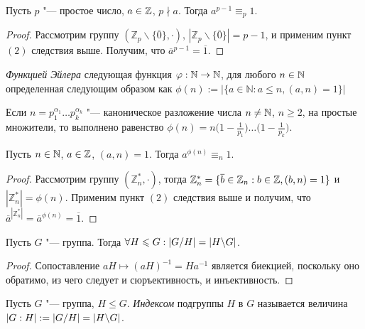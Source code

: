 \begin{corollary}
	Пусть $p$ "--- простое число, $a \in \mathbb{Z}$, $p \nmid a$. Тогда $a^{p-1} \equiv_p 1$.
\end{corollary}

\begin{proof}
	Рассмотрим группу $(\mathbb{Z}_p\backslash\{\overline{0}\}, \cdot)$, $|\mathbb{Z}_p\backslash\{\overline{0}\}| = p - 1$, и применим пункт $(2)$ следствия выше. Получим, что $\overline{a}^{p - 1} = \overline{1}$.
\end{proof}

\begin{definition}
	\textit{Функцией Эйлера} следующая функция $\varphi: \mathbb{N} \to \mathbb{N}$, для любого $n \in \mathbb{N}$ определенная следующим образом как $\phi(n) := \left|\{a \in \mathbb{N}: a \le n, (a, n) = 1\}\right|$
\end{definition}

\begin{note}
	Если $n = p_1^{\alpha_1}\dots p_k^{\alpha_k}$ "--- каноническое разложение числа $n \ne \mathbb{N}$, $n \ge 2$, на простые множители, то выполнено равенство $\phi(n) = n\big(1 - \frac{1}{p_1}\big)\dots\big(1 - \frac{1}{p_k}\big)$.
\end{note}

\begin{theorem}[Эйлера]
	Пусть $n \in \mathbb{N}$, $a \in \mathbb{Z}$, $(a, n) = 1$. Тогда $a^{\phi(n)} \equiv_n 1$.
\end{theorem}

\begin{proof}
	Рассмотрим группу $(\mathbb{Z}_n^*, \cdot)$, тогда $\mathbb{Z}_n^* = \{\overline{b} \in \mathbb{Z}_n: b \in \mathbb{Z}, (b, n) = 1\}$ и $|\mathbb{Z}_n^*| = \phi(n)$. Применим пункт $(2)$ следствия выше и получим, что $\overline{a}^{|\mathbb{Z}_n^*|} = \overline{a}^{\phi(n)} = \overline{1}$.
\end{proof}

\begin{proposition}
	Пусть $G$ "--- группа. Тогда $\forall H \le G: |G / H| \hm= |H \bs G|$.
\end{proposition}

\begin{proof}
	Сопоставление $aH \mapsto (aH)^{-1} = Ha^{-1}$ является биекцией, поскольку оно обратимо, из чего следует и сюръективность, и инъективность.
\end{proof}

\begin{definition}
	Пусть $G$ "--- группа, $H \le G$. \textit{Индексом} подгруппы $H$ в $G$ называется величина $|G : H| := |G / H| = |H \backslash G|$.
\end{definition}